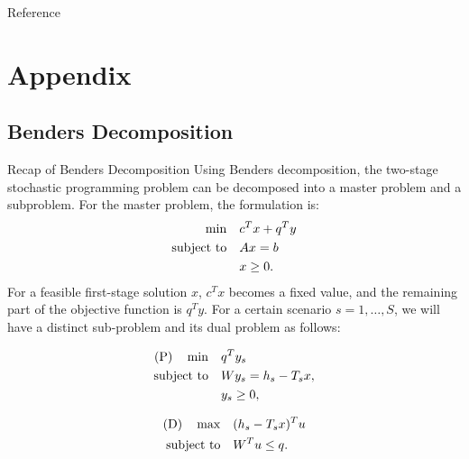 \documentclass[aspectratio=169]{beamer}
\begin{document}
\begin{frame}[allowframebreaks]{Reference}
% 
%  
    \printbibliography
\end{frame}

\section{Appendix}
\subsection{Benders Decomposition}
\begin{frame}{Recap of Benders Decomposition}
Using Benders decomposition, the two-stage stochastic programming problem can be decomposed into a master problem and a subproblem. For the master problem, the formulation is:
\begin{align*}
          \min \quad & c^T x + q^T y \\
    \operatorname{subject~to} \quad & Ax = b \\
                     &  x \geq 0.
\end{align*}
For a feasible first-stage solution $x$, $c^T x$ becomes a fixed value, and the remaining part of the objective function is $q^T y$. For a certain scenario $s = 1, \dots, S$, we will have a distinct sub-problem and its dual problem as follows:
\vspace{-1.5em}
\begin{multicols}{2}
    \begin{align*}
        \text{(P)} \quad  \min \quad & q^T y_s \\
                    \operatorname{subject~to} \quad & Wy_s = h_s - T_s x, \\
                                     &  y_s \geq 0,
    \end{align*}
    \columnbreak
    
    \begin{align*}
        \text{(D)} \quad \max \quad & (h_s - T_s x)^T u \\
                   \operatorname{subject~to} \quad & W^T u \leq q.
    \end{align*}
\end{multicols}
\end{frame}
\end{document}

